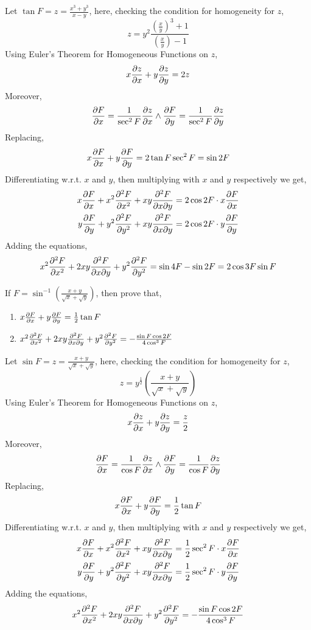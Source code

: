 \begin{anse}
	Let $\tan F=z=\frac{x^3+y^3}{x-y}$, here, checking the condition for homogeneity for $z$,
	\[z=y^2\frac{\left(\frac{x}{y}\right)^3+1}{\left(\frac{x}{y}\right)-1}\]
	Using Euler's Theorem for Homogeneous Functions on $z$,
	\[x\pdv{z}{x}+y\pdv{z}{y}=2z\]
	Moreover,
	\[\pdv{F}{x}=\frac{1}{\sec^2F}\pdv{z}{x} \land \pdv{F}{y}=\frac{1}{\sec^2F}\pdv{z}{y} \]
	Replacing,
	\[x\pdv{F}{x}+y\pdv{F}{y}=2\tan F \sec^2F=\sin 2F\]
	Differentiating w.r.t. $x$ and $y$, then multiplying with $x$ and $y$ respectively we get,
	\[\begin{split}
		x\pdv{F}{x}+x^2\pdv[2]{F}{x}+xy\pdv{F}{x}{y}&=2\cos2F\cdot x\pdv{F}{x}\\
		y\pdv{F}{y}+y^2\pdv[2]{F}{y}+xy\pdv{F}{x}{y}&=2\cos2F\cdot y\pdv{F}{y}\\
	\end{split}\]
	Adding the equations,
	\[x^2\pdv[2]{F}{x}+2xy\pdv{F}{x}{y}+y^2\pdv[2]{F}{y}=\sin4F-\sin2F=2\cos3F\sin F\]
\end{anse}
\begin{asign}
	If $F=\sin^{-1}\left(\frac{x+y}{\sqrt{x}+\sqrt{y}}\right)$, then prove that, \begin{enumerate}
		\item $x\pdv{F}{x}+y\pdv{F}{y}=\frac{1}{2}\tan F$
		\item $x^2\pdv[2]{F}{x}+2xy\pdv{F}{x}{y}+y^2\pdv[2]{F}{y}=-\frac{\sin F\cos 2F}{4\cos^3F}$
	\end{enumerate}
\end{asign}
\begin{anse}
	Let $\sin F=z=\frac{x+y}{\sqrt{x}+\sqrt{y}}$, here, checking the condition for homogeneity for $z$,
	\[z=y^\frac{1}{2}\left( \frac{x+y}{\sqrt{x}+\sqrt{y}} \right)\]
	Using Euler's Theorem for Homogeneous Functions on $z$,
	\[x\pdv{z}{x}+y\pdv{z}{y}=\frac{z}{2}\]
	Moreover,
	\[\pdv{F}{x}=\frac{1}{\cos F}\pdv{z}{x} \land \pdv{F}{y}=\frac{1}{\cos F}\pdv{z}{y} \]
	Replacing,
	\[x\pdv{F}{x}+y\pdv{F}{y}=\frac{1}{2}\tan F\]
	Differentiating w.r.t. $x$ and $y$, then multiplying with $x$ and $y$ respectively we get,
	\[\begin{split}
		x\pdv{F}{x}+x^2\pdv[2]{F}{x}+xy\pdv{F}{x}{y}&=\frac{1}{2}\sec^2 F\cdot x\pdv{F}{x}\\
		y\pdv{F}{y}+y^2\pdv[2]{F}{y}+xy\pdv{F}{x}{y}&=\frac{1}{2}\sec^2 F\cdot y\pdv{F}{y}\\
	\end{split}\]
	Adding the equations,
	\[x^2\pdv[2]{F}{x}+2xy\pdv{F}{x}{y}+y^2\pdv[2]{F}{y}=-\frac{\sin F\cos 2F}{4\cos^3F}\]
\end{anse}
